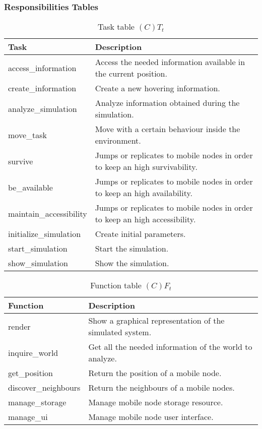 \subsubsection{Responsibilities Tables}

\begin{table}[H]
	\centering
	\begin{tabular}{|p{5cm}|p{7cm}|}
			\hline
			\textbf{Task} & \textbf{Description} \\
			\hline
			access\_information & Access the needed information available in the
			current position.\\
			\hline
			create\_information & Create a new hovering information. \\
			\hline
			analyze\_simulation & Analyze information obtained during the
			simulation.\\
			\hline
			move\_task & Move with a certain behaviour inside the environment. \\
			\hline
			survive & Jumps or replicates to mobile nodes in order to keep an high
			survivability. \\
			\hline
			be\_available & Jumps or replicates to mobile nodes in order to keep an
			high availability. \\
			\hline
			maintain\_accessibility & Jumps or replicates to mobile nodes in order to
			keep an high accessibility. \\
			\hline
			initialize\_simulation & Create initial parameters. \\
			\hline
			start\_simulation & Start the simulation. \\
			\hline
			show\_simulation & Show the simulation. \\
			\hline
		\end{tabular}
	\caption{Task table $(C)T_t$}
	\label{tab:ctt}
\end{table}

\begin{table}[H]
	\centering
	\begin{tabular}{|p{5cm}|p{7cm}|}
			\hline
			\textbf{Function} & \textbf{Description} \\
			\hline
			render & Show a graphical representation of the simulated system. \\
			\hline
			inquire\_world & Get all the needed information of the world to analyze.
			\\
			\hline
			get\_position & Return the position of a mobile node. \\
			\hline
			discover\_neighbours & Return the neighbours of a mobile nodes. \\
			\hline
			manage\_storage & Manage mobile node storage resource. \\
			\hline
			manage\_ui & Manage mobile node user interface. \\
			\hline
		\end{tabular}
	\caption{Function table $(C)F_t$}
	\label{tab:cft}
\end{table}

